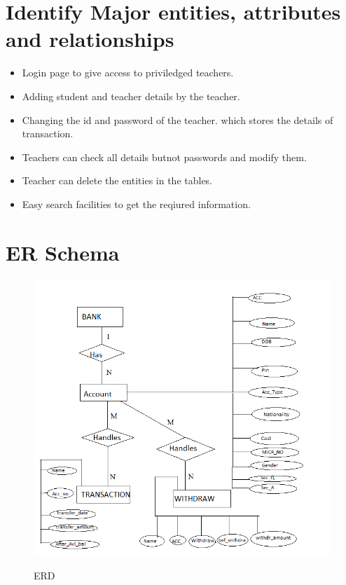 \thispagestyle{fancy}
\section{Identify Major entities, attributes and relationships}
\begin{itemize}
\item Login page to give access to priviledged teachers.
\item Adding student and teacher details by the teacher.
\item Changing the id and password of the teacher.
which stores the details of transaction.
\item Teachers can check all details butnot passwords and modify them.
\item Teacher can delete the entities in the tables.
\item Easy  search facilities to get the reqiured information.
\end{itemize}

\thispagestyle{fancy}

\section{ER Schema}
\begin{figure}[H]
\centering
\caption{ERD}
\includegraphics[scale=.5]{./erd.png}
\\[0.2in]
\label{fig:ER diagram}
\end{figure}

